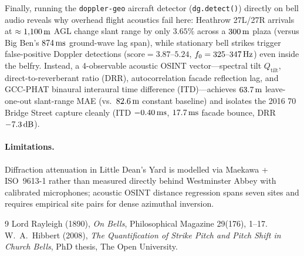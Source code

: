 \documentclass[11pt,a4paper]{article}
\begin{document}
Finally, running the \texttt{doppler-geo} aircraft detector (\texttt{dg.detect()}) directly on bell audio reveals why overhead flight acoustics fail here: Heathrow 27L/27R arrivals at $\approx 1{,}100\text{\,m}$ AGL change slant range by only $3.65\%$ across a $300\text{\,m}$ plaza (versus Big Ben's $874\text{\,ms}$ ground-wave lag span), while stationary bell strikes trigger false-positive Doppler detections ($\mathrm{score} = 3.87\text{--}5.24$, $f_0 = 325\text{--}347\text{\,Hz}$) even inside the belfry. Instead, a 4-observable acoustic OSINT vector---spectral tilt $Q_{\mathrm{tilt}}$, direct-to-reverberant ratio (DRR), autocorrelation facade reflection lag, and GCC-PHAT binaural interaural time difference (ITD)---achieves $63.7\text{\,m}$ leave-one-out slant-range MAE (vs.\ $82.6\text{\,m}$ constant baseline) and isolates the 2016 70 Bridge Street capture cleanly (ITD $-0.40\text{\,ms}$, $17.7\text{\,ms}$ facade bounce, DRR $-7.3\text{\,dB}$).

\paragraph{Limitations.} Diffraction attenuation in Little Dean's Yard is modelled via Maekawa + ISO~9613-1 rather than measured directly behind Westminster Abbey with calibrated microphones; acoustic OSINT distance regression spans seven sites and requires empirical site pairs for dense azimuthal inversion.

\begin{thebibliography}{9}
 Lord Rayleigh (1890), \emph{On Bells}, Philosophical Magazine 29(176), 1--17.
 W.~A.~Hibbert (2008), \emph{The Quantification of Strike Pitch and Pitch Shift in Church Bells}, PhD thesis, The Open University.
\end{thebibliography}
\end{document}
